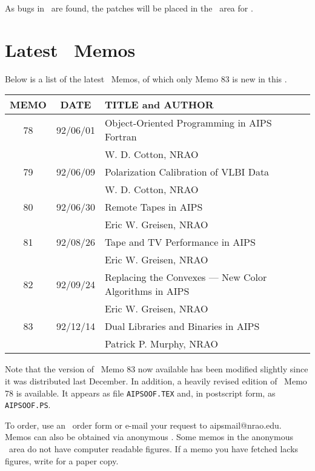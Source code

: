 As bugs in \RELEASENAME\ are found, the patches will be placed in the
\ftp\ area for \hbox{{\RELEASENAME}}.


\section{Latest \AIPS\ Memos}

Below is a list of the latest \AIPS\ Memos, of which only Memo 83 is
new in this \Aipsletter.
\begin{center}
\begin{tabular}{ccl}
\hline
MEMO  &        DATE   & TITLE and AUTHOR  \\
\hline\hline
  78 & 92/06/01 & Object-Oriented Programming in AIPS Fortran \\
     &          & \qquad W. D. Cotton, NRAO \\
  79 & 92/06/09 & Polarization Calibration of VLBI Data \\
     &          & \qquad W. D. Cotton, NRAO \\
  80 & 92/06/30 & Remote Tapes in AIPS \\
     &          & \qquad Eric W. Greisen, NRAO \\
  81 & 92/08/26 & Tape and TV Performance in AIPS \\
     &          & \qquad Eric W. Greisen, NRAO \\
  82 & 92/09/24 & Replacing the Convexes --- New Color Algorithms in
                    AIPS \\
     &          & \qquad Eric W. Greisen, NRAO \\
  83 & 92/12/14 & Dual Libraries and Binaries in AIPS \\
     &          & \qquad Patrick P. Murphy, NRAO \\
\hline
\end{tabular}
\end{center}
Note that the version of \AIPS\ Memo 83 now available has been
modified slightly since it was distributed last December.  In
addition, a heavily revised edition of \AIPS\ Memo 78 is available.
It appears as file {\tt AIPSOOF.TEX} and, in postscript form, as
\hbox{{\tt AIPSOOF.PS}}.

To order, use an \AIPS\ order form or e-mail your request to
aipsmail@nrao.edu.  Memos can also be obtained via anonymous \ftp.
Some memos in the anonymous \ftp\ area do not have computer readable
figures.  If a memo you have fetched lacks figures, write for a paper
copy.

